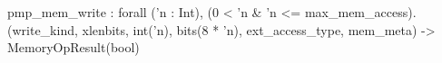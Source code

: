 pmp_mem_write : forall ('n : Int), (0 < 'n & 'n <= max_mem_access).
  (write_kind, xlenbits, int('n), bits(8 * 'n), ext_access_type, mem_meta) -> MemoryOpResult(bool)